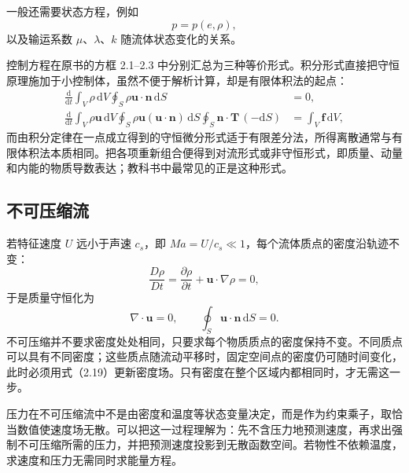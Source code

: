 \documentclass[11pt,a4paper,openany,fontset=none]{ctexbook}
\newenvironment{sourceblock}
  {\par\addvspace{0.65\baselineskip}\noindent\begin{minipage}{\linewidth}\centering}
  {\end{minipage}\par\addvspace{0.48\baselineskip}}
\begin{document}
一般还需要状态方程，例如
\begin{equation}
 p=p(e,\rho), \tag{2.18}
\end{equation}
以及输运系数 $\mu$、$\lambda$、$k$ 随流体状态变化的关系。

控制方程在原书的方框 2.1--2.3 中分别汇总为三种等价形式。积分形式直接把守恒原理施加于小控制体，虽然不便于解析计算，却是有限体积法的起点：
\begin{align*}
\frac{\mathrm d}{\mathrm dt}\int_V\rho\,\mathrm dV
\oint_S\rho\bm u\cdot\bm n\,\mathrm dS&=0,\\
\frac{\mathrm d}{\mathrm dt}\int_V\rho\bm u\,\mathrm dV
\oint_S\rho\bm u(\bm u\cdot\bm n)\,\mathrm dS
\oint_S\bm n\cdot\bm T\,(-\mathrm dS)&=\int_V\bm f\,\mathrm dV,
\end{align*}
而由积分定律在一点成立得到的守恒微分形式适于有限差分法，所得离散通常与有限体积法本质相同。把各项重新组合便得到对流形式或非守恒形式，即质量、动量和内能的物质导数表达；教科书中最常见的正是这种形式。

\begin{sourceblock}
\end{sourceblock}

\subsection{不可压缩流}

若特征速度 $U$ 远小于声速 $c_s$，即 $Ma=U/c_s\ll1$，每个流体质点的密度沿轨迹不变：
\begin{equation}
 \frac{D\rho}{Dt}=\frac{\partial\rho}{\partial t}+\bm u\cdot\nabla\rho=0, \tag{2.19}
\end{equation}
于是质量守恒化为
\begin{equation}
 \nabla\cdot\bm u=0,\qquad \oint_S\bm u\cdot\bm n\,\mathrm dS=0. \tag{2.20--2.21}
\end{equation}
不可压缩并不要求密度处处相同，只要求每个物质质点的密度保持不变。不同质点可以具有不同密度；这些质点随流动平移时，固定空间点的密度仍可随时间变化，此时必须用式（2.19）更新密度场。只有密度在整个区域内都相同时，才无需这一步。

压力在不可压缩流中不是由密度和温度等状态变量决定，而是作为约束乘子，取恰当数值使速度场无散。可以把这一过程理解为：先不含压力地预测速度，再求出强制不可压缩所需的压力，并把预测速度投影到无散函数空间。若物性不依赖温度，求速度和压力无需同时求能量方程。
\end{document}
